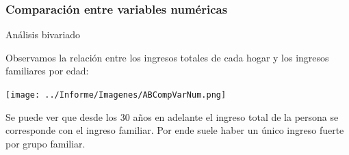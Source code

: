 \documentclass[pdf]{beamer}
\def\\{}%
\begin{document}
{%

 


 
    \subsubsection{Comparación entre variables numéricas}

\begin{frame}{Análisis bivariado}

    Observamos la relación entre los ingresos totales de cada hogar y los ingresos familiares por edad:
    \begin{center}
        \texttt{[image: ../Informe/Imagenes/ABCompVarNum.png]}
    \end{center}
    Se puede ver que desde los 30 años en adelante el ingreso total de la persona se corresponde con el ingreso familiar. Por ende suele haber un único ingreso fuerte por grupo familiar.


\end{frame}}
\end{document}
